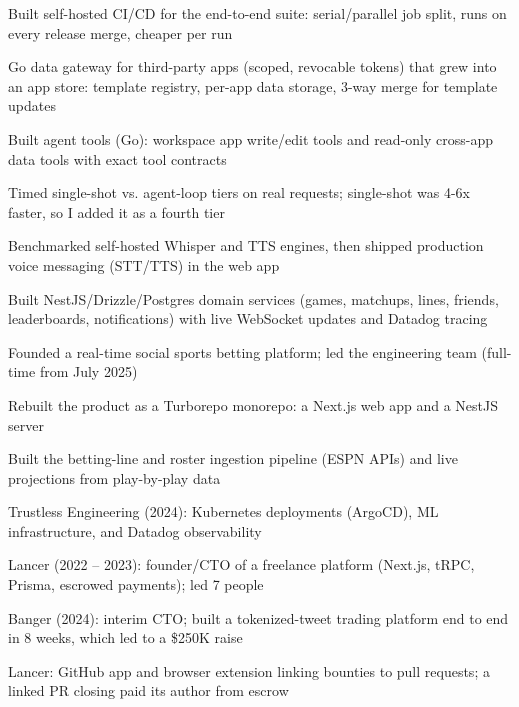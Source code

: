 \documentclass[print]{jack-resume}
\begin{document}
\begin{tightemize}
    \item Built self-hosted CI/CD for the end-to-end suite: serial/parallel job split, runs on every release merge, cheaper per run
    \item Go data gateway for third-party apps (scoped, revocable tokens) that grew into an app store: template registry, per-app data storage, 3-way merge for template updates
    \item Built agent tools (Go): workspace app write/edit tools and read-only cross-app data tools with exact tool contracts
    \item Timed single-shot vs. agent-loop tiers on real requests; single-shot was 4-6x faster, so I added it as a fourth tier
    \item Benchmarked self-hosted Whisper and TTS engines, then shipped production voice messaging (STT/TTS) in the web app
\end{tightemize}
\sectionsep

\begin{tightemize}
    \item Built NestJS/Drizzle/Postgres domain services (games, matchups, lines, friends, leaderboards, notifications) with live WebSocket updates and Datadog tracing
    \item Founded a real-time social sports betting platform; led the engineering team (full-time from July 2025)
    \item Rebuilt the product as a Turborepo monorepo: a Next.js web app and a NestJS server
    \item Built the betting-line and roster ingestion pipeline (ESPN APIs) and live projections from play-by-play data
\end{tightemize}
\sectionsep

\begin{tightemize}
    \item Trustless Engineering (2024): Kubernetes deployments (ArgoCD), ML infrastructure, and Datadog observability
    \item Lancer (2022 -- 2023): founder/CTO of a freelance platform (Next.js, tRPC, Prisma, escrowed payments); led 7 people
    \item Banger (2024): interim CTO; built a tokenized-tweet trading platform end to end in 8 weeks, which led to a \$250K raise
    \item Lancer: GitHub app and browser extension linking bounties to pull requests; a linked PR closing paid its author from escrow
\end{tightemize}
\sectionsep
\end{document}

